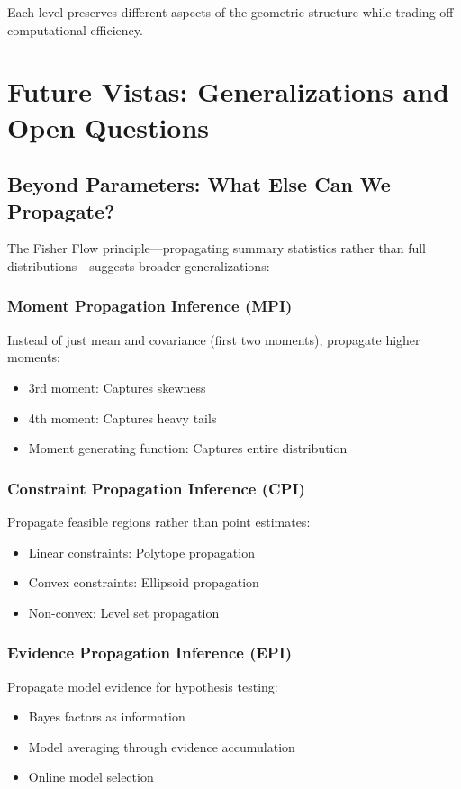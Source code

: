 \documentclass[11pt]{article}
\begin{document}
Each level preserves different aspects of the geometric structure while trading off computational efficiency.

\section{Future Vistas: Generalizations and Open Questions}

\subsection{Beyond Parameters: What Else Can We Propagate?}

The Fisher Flow principle—propagating summary statistics rather than full distributions—suggests broader generalizations:

\subsubsection{Moment Propagation Inference (MPI)}
Instead of just mean and covariance (first two moments), propagate higher moments:
\begin{itemize}
\item 3rd moment: Captures skewness
\item 4th moment: Captures heavy tails
\item Moment generating function: Captures entire distribution
\end{itemize}

\subsubsection{Constraint Propagation Inference (CPI)}
Propagate feasible regions rather than point estimates:
\begin{itemize}
\item Linear constraints: Polytope propagation
\item Convex constraints: Ellipsoid propagation
\item Non-convex: Level set propagation
\end{itemize}

\subsubsection{Evidence Propagation Inference (EPI)}
Propagate model evidence for hypothesis testing:
\begin{itemize}
\item Bayes factors as information
\item Model averaging through evidence accumulation
\item Online model selection
\end{itemize}
\end{document}
